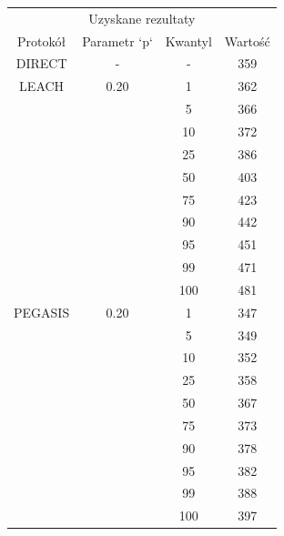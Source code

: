 \documentclass[a4paper,12pt,twoside,openany]{report}
\begin{document}
\begin{longtable}{*{4}{c}}
\toprule
\multicolumn{4}{c}{Uzyskane rezultaty} \\
Protokół	& Parametr `p`	& Kwantyl	& Wartość \\
\midrule
\endhead
DIRECT	& - 	& -	& 359 \\*
\midrule
LEACH	& 0.20	& 1	& 362 \\*
	&	& 5	& 366 \\*
	&	& 10	& 372 \\*
	&	& 25	& 386 \\*
	&	& 50	& 403 \\*
	&	& 75	& 423 \\*
	&	& 90	& 442 \\*
	&	& 95	& 451 \\*
	&	& 99	& 471 \\*
	&	& 100	& 481 \\*
\midrule
PEGASIS	& 0.20	& 1	& 347 \\*
	&	& 5	& 349 \\*
	&	& 10	& 352 \\*
	&	& 25	& 358 \\*
	&	& 50	& 367 \\*
	&	& 75	& 373 \\*
	&	& 90	& 378 \\*
	&	& 95	& 382 \\*
	&	& 99	& 388 \\*
	&	& 100	& 397 \\*
\bottomrule
\end{longtable}
\end{document}

